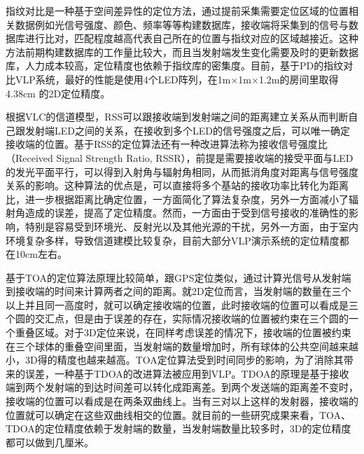 指纹对比是一种基于空间差异性的定位方法，通过提前采集需要定位区域的位置相关数据例如光信号强度、颜色、频率等等构建数据库，接收端将采集到的信号与数据库进行比对，匹配程度越高代表自己所在的位置与指纹对应的区域越接近。这种方法前期构建数据库的工作量比较大，而且当发射端发生变化需要及时的更新数据库，人力成本较高，定位精度也依赖于指纹库的密集度。目前，基于PD的指纹对比VLP系统，最好的性能是使用4个LED阵列，在1m$\times$1m$\times$1.2m的房间里取得4.38cm 的2D定位精度\cite{fingerprinting-pd-1}。

根据VLC的信道模型，RSS可以跟接收端到发射端之间的距离建立关系从而判断自己跟发射端LED之间的关系，在接收到多个LED的信号强度之后，可以唯一确定接收端的位置\cite{vlp-pd-rss,vlp-9728724}。基于RSS的定位算法还有一种改进算法称为接收信号强度比（Received Signal Strength Ratio, RSSR），前提是需要接收端的接受平面与LED的发光平面平行，可以得到入射角与辐射角相同，从而抵消角度对距离与信号强度关系的影响。这种算法的优点是，可以直接将多个基站的接收功率比转化为距离比，进一步根据距离比确定位置，一方面简化了算法复杂度，另外一方面减小了辐射角造成的误差，提高了定位精度\cite{vlp-pd-rssr}。然而，一方面由于受到信号接收的准确性的影响，特别是容易受到环境光、反射光以及其他光源的干扰，另外一方面，由于室内环境复杂多样，导致信道建模比较复杂，目前大部分VLP演示系统的定位精度都在10cm左右。

基于TOA的定位算法原理比较简单，跟GPS定位类似，通过计算光信号从发射端到接收端的时间来计算两者之间的距离。就2D定位而言，当发射端的数量在三个以上并且同一高度时，就可以确定接收端的位置，此时接收端的位置可以看成是三个圆的交汇点，但是由于误差的存在，实际情况接收端的位置被约束在三个圆的一个重叠区域。对于3D定位来说，在同样考虑误差的情况下，接收端的位置被约束在三个球体的重叠空间里面，当发射端的数量增加时，所有球体的公共空间越来越小，3D得的精度也越来越高\cite{vlp-pd-toa}。TOA定位算法受到时间同步的影响，为了消除其带来的误差，一种基于TDOA的改进算法被应用到VLP。TDOA的原理是基于接收端到两个发射端的到达时间差可以转化成距离差。到两个发送端的距离差不变时，接收端的位置可以看成是在两条双曲线上。当有三对以上这样的发射器，接收端的位置就可以确定在这些双曲线相交的位置\cite{vlp-pd-tdoa}。就目前的一些研究成果来看，TOA、TDOA的定位精度依赖于发射端的数量，当发射端数量比较多时，3D的定位精度都可以做到几厘米。

